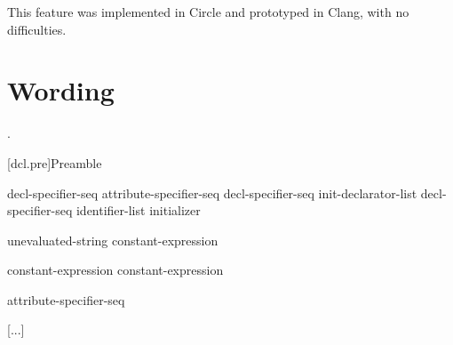 \documentclass{wg21}
\begin{document}
This feature was implemented in Circle and prototyped in Clang, with no difficulties.

\section{Wording}

.



[dcl.pre]{Preamble}

\begin{bnf}
    \br
    decl-specifier-seq  \terminal{;}\br
    attribute-specifier-seq decl-specifier-seq init-declarator-list \terminal{;}\br
     decl-specifier-seq  \terminal{[} identifier-list \terminal{]} initializer \terminal{;}
\end{bnf}

\begin{addedblock}
\begin{bnf}
    \br
        unevaluated-string\br
        constant-expression\br
\end{bnf}
\end{addedblock}

\begin{bnf}
    \br
     \terminal{(} constant-expression \terminal{)} \terminal{;}\br
     \terminal{(} constant-expression \terminal{,}  \terminal{)} \terminal{;}\br
\end{bnf}

\begin{bnf}
    \br
    \terminal{;}
\end{bnf}

\begin{bnf}
    \br
    attribute-specifier-seq \terminal{;}
\end{bnf}



\pnum
{}%

\textcolor{noteclr}{[...]}
\end{document}
